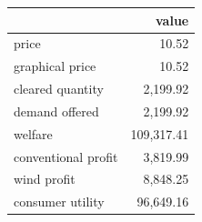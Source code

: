 \begin{tabular}{lr}
\toprule
 & value \\
\midrule
price & 10.52 \\
graphical price & 10.52 \\
cleared quantity & 2,199.92 \\
demand offered & 2,199.92 \\
welfare & 109,317.41 \\
conventional profit & 3,819.99 \\
wind profit & 8,848.25 \\
consumer utility & 96,649.16 \\
\bottomrule
\end{tabular}
